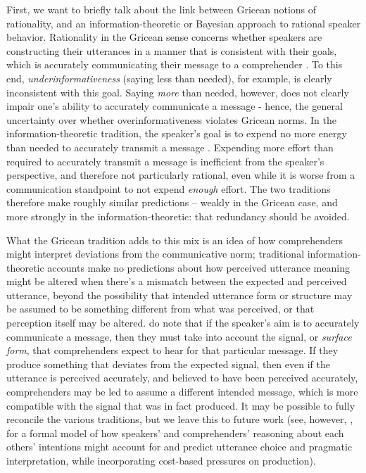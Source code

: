 First, we want to briefly talk about the link between Gricean notions of
rationality, and an information-theoretic or Bayesian approach to
rational speaker behavior. Rationality in the Gricean sense concerns
whether speakers are constructing their utterances in a manner that is
consistent with their goals, which is accurately communicating their
message to a comprehender \citep{Grice1975}. To this end,
\emph{underinformativeness} (saying less than needed), for example, is
clearly inconsistent with this goal. Saying \emph{more} than needed,
however, does not clearly impair one's ability to accurately communicate
a message - hence, the general uncertainty over whether
overinformativeness violates Gricean norms. In the information-theoretic
tradition, the speaker's goal is to expend no more energy than needed to
accurately transmit a message \citep{Jaeger2010}. Expending more effort than
required to accurately transmit a message is inefficient from the
speaker's perspective, and therefore not particularly rational, even
while it is worse from a communication standpoint to not expend
\emph{enough} effort. The two traditions therefore make roughly similar
predictions -- weakly in the Gricean case, and more strongly in the
information-theoretic: that redundancy should be avoided.

What the Gricean tradition adds to this mix is an idea of how
comprehenders might interpret deviations from the communicative norm;
traditional information-theoretic accounts make no predictions about how
perceived utterance meaning might be altered when there's a mismatch
between the expected and perceived utterance, beyond the possibility
that intended utterance form or structure may be assumed to be something
different from what was perceived, or that perception itself may be
altered. \citet{Jaeger2017} do note that if the speaker's aim is to
accurately communicate a message, then they must take into account the
signal, or \emph{surface form}, that comprehenders expect to hear for
that particular message. If they produce something that deviates from
the expected signal, then even if the utterance is perceived accurately,
and believed to have been perceived accurately, comprehenders may be led
to assume a different intended message, which is more compatible with
the signal that was in fact produced. It may be possible to fully
reconcile the various traditions, but we leave this to future work (see,
however, \citealp{Frank2012}, for a formal model of how speakers' and
comprehenders' reasoning about each others' intentions might account for
and predict utterance choice and pragmatic interpretation, while
incorporating cost-based pressures on production).

